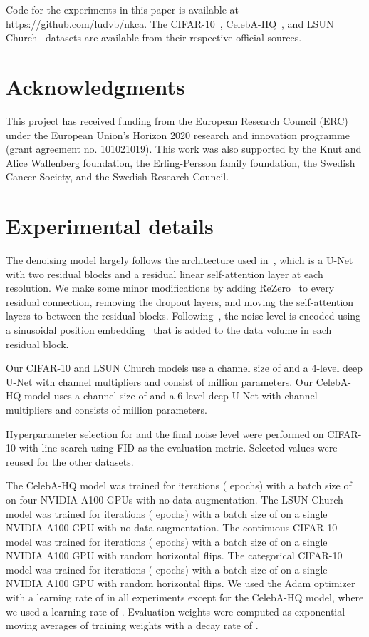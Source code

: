 \documentclass[10pt,twocolumn,letterpaper]{article}
\begin{document}
Code for the experiments in this paper is available at \url{https://github.com/ludvb/nkca}.
The CIFAR-10~\cite{krizhevsky2009learning}, CelebA-HQ~\cite{karras17progressive}, and LSUN Church~\cite{yu15lsun} datasets are available from their respective official sources.


\section*{Acknowledgments}

This project has received funding from the European Research Council (ERC) under the European Union’s Horizon 2020 research and innovation programme (grant agreement no. 101021019). This work was also supported by the Knut and Alice Wallenberg foundation, the Erling-Persson family foundation, the Swedish Cancer Society, and the Swedish Research Council.


{\printbibliography}

\appendix
\onecolumn

\section{Experimental details}\label{app:implementation}

The denoising model  largely follows the architecture used in~\textcite{hoogeboom2021argmax}, which is a U-Net~\cite{ronneberger2015u} with two residual blocks and a residual linear self-attention layer at each resolution.
We make some minor modifications by adding ReZero~\cite{bachlechner21rezero} to every residual connection, removing the dropout layers, and moving the self-attention layers to between the residual blocks.
Following~\cite{ho2020denoising}, the noise level is encoded using a sinusoidal position embedding~\cite{vaswani17attention} that is added to the data volume in each residual block.

Our CIFAR-10 and LSUN Church models use a channel size of  and a 4-level deep U-Net with channel multipliers  and consist of  million parameters.
Our CelebA-HQ model uses a channel size of  and a 6-level deep U-Net with channel multipliers  and consists of  million parameters.

Hyperparameter selection for  and the final noise level  were performed on CIFAR-10 with line search using FID as the evaluation metric.
Selected values were reused for the other datasets.

The CelebA-HQ model was trained for  iterations ( epochs) with a batch size of  on four NVIDIA A100 GPUs with no data augmentation.
The LSUN Church model was trained for  iterations ( epochs) with a batch size of  on a single NVIDIA A100 GPU with no data augmentation.
The continuous CIFAR-10 model was trained for  iterations ( epochs) with a batch size of  on a single NVIDIA A100 GPU with random horizontal flips.
The categorical CIFAR-10 model was trained for  iterations ( epochs) with a batch size of  on a single NVIDIA A100 GPU with random horizontal flips.
We used the Adam optimizer~\cite{kingma2014adam} with a learning rate of  in all experiments except for the CelebA-HQ model, where we used a learning rate of .
Evaluation weights were computed as exponential moving averages of training weights with a decay rate of .
\end{document}
